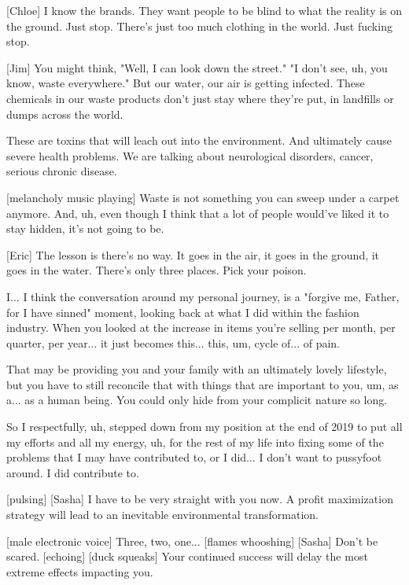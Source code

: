 \documentclass[a4paper]{article}
\begin{document}
	
	[Chloe] I know the brands. They want people to be blind to what the reality is on the ground.
	Just stop. There's just too much clothing in the world.
	Just fucking stop.
	
	
	[Jim] You might think, "Well, I can look down the street."
	"I don't see, uh, you know, waste everywhere."
	But our water, our air is getting infected.
	These chemicals in our waste products don't just stay where they're put, in landfills or dumps across the world.
	
	
	These are toxins that will leach out into the environment.
	And ultimately cause severe health problems. We are talking about neurological disorders, cancer, serious chronic disease.
	
	
	[melancholy music playing]
	Waste is not something you can sweep under a carpet anymore.
	And, uh, even though I think that a lot of people would've liked it to stay hidden, it's not going to be.
	
	
	[Eric] The lesson is there's no way.
	It goes in the air, it goes in the ground, it goes in the water.
	There's only three places.
	Pick your poison.
	
	
	I... I think the conversation around my personal journey, is a "forgive me, Father, for I have sinned" moment, looking back at what I did within the fashion industry.
	When you looked at the increase in items you're selling per month, per quarter, per year... it just becomes this... this, um, cycle of... of pain.
	
	
	That may be providing you and your family with an ultimately lovely lifestyle, but you have to still reconcile that with things that are important to you, um, as a... as a human being.
	You could only hide from your complicit nature so long.
	
	
	
	So I respectfully, uh, stepped down from my position at the end of 2019 to put all my efforts and all my energy, uh, for the rest of my life into fixing some of the problems that I may have contributed to, or I did...
	I don't want to pussyfoot around. I did contribute to.
	
	
	[pulsing]
	[Sasha] I have to be very straight with you now.
	A profit maximization strategy will lead to an inevitable environmental transformation.
	
	
	
	[male electronic voice] Three, two, one...
	[flames whooshing]
	[Sasha] Don't be scared. [echoing]
	[duck squeaks]
	Your continued success will delay the most extreme effects impacting you.
	
\end{document}

